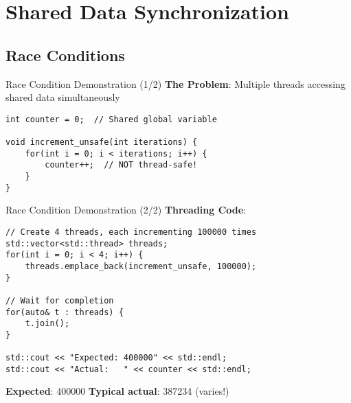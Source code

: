 \section{Shared Data Synchronization}

\subsection{Race Conditions}
\begin{frame}[fragile]{ Race Condition Demonstration (1/2)}
	\textbf{The Problem}: Multiple threads accessing shared data simultaneously

	\begin{verbatim}
int counter = 0;  // Shared global variable

void increment_unsafe(int iterations) {
    for(int i = 0; i < iterations; i++) {
        counter++;  // NOT thread-safe!
    }
}
	\end{verbatim}
\end{frame}

\begin{frame}[fragile]{ Race Condition Demonstration (2/2)}
	\textbf{Threading Code}:

	\begin{verbatim}
// Create 4 threads, each incrementing 100000 times
std::vector<std::thread> threads;
for(int i = 0; i < 4; i++) {
    threads.emplace_back(increment_unsafe, 100000);
}

// Wait for completion
for(auto& t : threads) {
    t.join();
}

std::cout << "Expected: 400000" << std::endl;
std::cout << "Actual:   " << counter << std::endl;
	\end{verbatim}

	\textbf{Expected}: 400000 \quad \textbf{Typical actual}: 387234 (varies!)
\end{frame}

